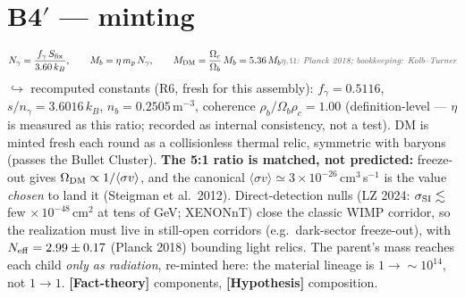 \documentclass[11pt]{article}
\newcommand{\factth}{\textcolor{green!40!black}{\textbf{[Fact-theory]}}}
\newcommand{\hyp}{\textcolor{orange!80!black}{\textbf{[Hypothesis]}}}
\newcommand{\own}[1]{\hfill{\small\textcolor{gray!70!black}{\textit{#1}}}}
\begin{document}
\section{B4$'$ --- minting}
\begin{equation}
N_\gamma=\frac{f_\gamma\,S_{\rm fix}}{3.60\,k_B},\qquad
M_b=\eta\,m_p\,N_\gamma,\qquad
M_{\rm DM}=\frac{\Omega_c}{\Omega_b}\,M_b=5.36\,M_b
\own{$\eta,\Omega$: Planck 2018; bookkeeping: Kolb--Turner}
\label{eq:b4mint}
\end{equation}
$\hookrightarrow$ recomputed constants (R6, fresh for this assembly): $f_\gamma=0.5116$, $s/n_\gamma=3.6016\,k_B$, $n_b=0.2505$\,m$^{-3}$, coherence $\rho_b/\Omega_b\rho_c=1.00$ (definition-level --- $\eta$ is measured as this ratio; recorded as internal consistency, not a test). DM is minted fresh each round as a collisionless thermal relic, symmetric with baryons (passes the Bullet Cluster). \textbf{The 5:1 ratio is matched, not predicted:} freeze-out gives $\Omega_{\rm DM}\propto1/\langle\sigma v\rangle$, and the canonical $\langle\sigma v\rangle\simeq3\times10^{-26}$\,cm$^3$\,s$^{-1}$ is the value \emph{chosen} to land it (Steigman et al.\ 2012). Direct-detection nulls (LZ 2024: $\sigma_{\rm SI}\lesssim\,$few$\,\times10^{-48}$\,cm$^2$ at tens of GeV; XENONnT) close the classic WIMP corridor, so the realization must live in still-open corridors (e.g.\ dark-sector freeze-out), with $N_{\rm eff}=2.99\pm0.17$ (Planck 2018) bounding light relics. The parent's mass reaches each child \emph{only as radiation}, re-minted here: the material lineage is $1\to\sim\!10^{14}$, not $1\to1$. \factth{} components, \hyp{} composition.

\end{document}
